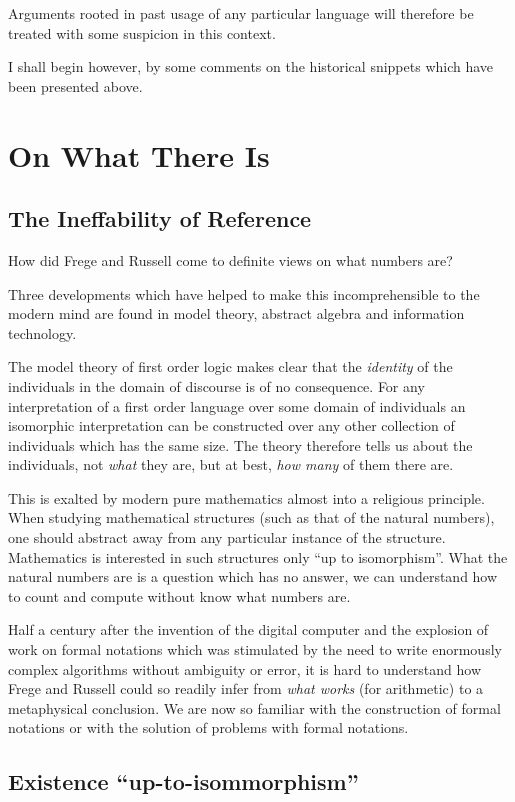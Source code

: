 \documentclass{rbjk}
\begin{document}
\begin{article}
Arguments rooted in past usage of any particular language will therefore be treated with some suspicion in this context.

I shall begin however, by some comments on the historical snippets which have been presented above.

\section{On What There Is}

\subsection{The Ineffability of Reference}

How did Frege and Russell come to definite views on what numbers are?

Three developments which have helped to make this incomprehensible to the modern mind are found in model theory, abstract algebra and information technology.

The model theory of first order logic makes clear that the {\it identity} of the individuals in the domain of discourse is of no consequence.
For any interpretation of a first order language over some domain of individuals an isomorphic interpretation can be constructed over any other collection of individuals which has the same size.
The theory therefore tells us about the individuals, not {\it what} they are, but at best, {\it how many} of them there are.

This is exalted by modern pure mathematics almost into a religious principle.
When studying mathematical structures (such as that of the natural numbers), one should abstract away from any particular instance of the structure.
Mathematics is interested in such structures only ``up to isomorphism''.
What the natural numbers are is a question which has no answer, we can understand how to count and compute without know what numbers are.

Half a century after the invention of the digital computer and the explosion of work on formal notations which was stimulated by the need to write enormously complex algorithms without ambiguity or error, it is hard to understand how Frege and Russell could so readily infer from {\it what works} (for arithmetic) to a metaphysical conclusion.
We are now so familiar with the construction of formal notations or with the solution of problems with formal notations.

\subsection{Existence ``up-to-isommorphism''}


\end{article}
\end{document}

